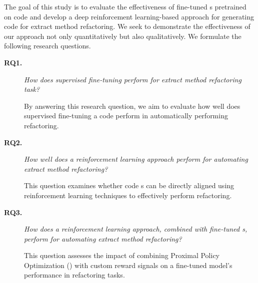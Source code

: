 The goal of this study is to evaluate the effectiveness of fine-tuned \llmsc{}s pretrained on code and develop a deep reinforcement learning-based approach for generating code for extract method refactoring. We seek to demonstrate the effectiveness of our approach not only quantitatively but also qualitatively.
We formulate the following research questions.
\newpage
\begin{description}

    \item [\textbf{RQ1.}] \textit{How does supervised fine-tuning perform for extract method refactoring task?}


By answering this research question, we aim to evaluate how well does supervised fine-tuning a code \llm{} perform in automatically performing \exm{} refactoring.


    \item [\textbf{RQ2.}] \textit{How well does a reinforcement learning approach perform for automating extract method refactoring?}


This question examines whether code \llm{}s can be directly aligned using reinforcement learning techniques to effectively perform \exm{} refactoring.


    \item [\textbf{RQ3.}] \textit{How does a reinforcement learning approach, combined with fine-tuned \llm{}s, perform for automating extract method refactoring?}

This question assesses the impact of combining Proximal Policy Optimization (\ppo{}) with custom reward signals on a fine-tuned model's performance in \exm{} refactoring tasks.
\end{description}

